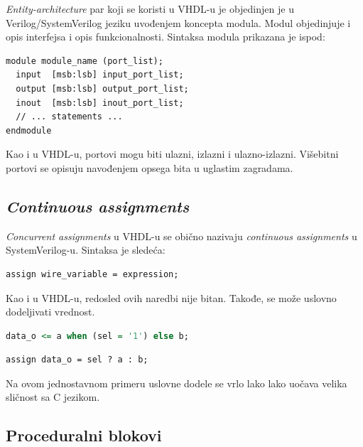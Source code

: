 \emph{Entity-architecture} par koji se koristi u VHDL-u je objedinjen je u
Verilog/SystemVerilog jeziku uvođenjem koncepta modula. Modul objedinjuje i
opis interfejsa i opis funkcionalnosti. Sintaksa modula prikazana je ispod:

\begin{lstlisting}
module module_name (port_list);
  input  [msb:lsb] input_port_list;
  output [msb:lsb] output_port_list;
  inout  [msb:lsb] inout_port_list;
  // ... statements ...
endmodule
\end{lstlisting}

Kao i u VHDL-u, portovi mogu biti ulazni, izlazni i ulazno-izlazni. Višebitni
portovi se opisuju navođenjem opsega bita u uglastim zagradama.


\subsection{\emph{Continuous assignments}}

\emph{Concurrent assignments} u VHDL-u se obično nazivaju \emph{continuous
  assignments} u SystemVerilog-u. Sintaksa je sledeća:

\begin{lstlisting}
assign wire_variable = expression;
\end{lstlisting}

Kao i u VHDL-u, redosled ovih naredbi nije bitan.
Takođe, se može uslovno dodeljivati vrednost.

\begin{lstlisting}[language=VHDL]
data_o <= a when (sel = '1') else b;
\end{lstlisting}
\begin{lstlisting}
assign data_o = sel ? a : b;
\end{lstlisting}

Na ovom jednostavnom primeru uslovne dodele se vrlo lako lako uočava velika
sličnost sa C jezikom.


\subsection{Proceduralni blokovi}


